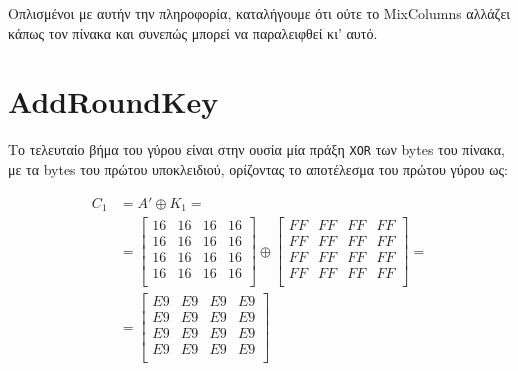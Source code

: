 \documentclass{article}
\begin{document}
Οπλισμένοι με αυτήν την πληροφορία, καταλήγουμε ότι ούτε το MixColumns αλλάζει κάπως τον πίνακα και συνεπώς μπορεί να παραλειφθεί κι' αυτό.

\section*{AddRoundKey}

Το τελευταίο βήμα του γύρου είναι στην ουσία μία πράξη \texttt{XOR} των bytes του πίνακα, με τα bytes του πρώτου υποκλειδιού, ορίζοντας το αποτέλεσμα του πρώτου γύρου ως:

\begin{align*}
C_1 &= A' \oplus K_1 = \\
    &=
    \begin{bmatrix}
    16 & 16 & 16 & 16 \\
    16 & 16 & 16 & 16 \\
    16 & 16 & 16 & 16 \\
    16 & 16 & 16 & 16 \\
    \end{bmatrix} \oplus
    \begin{bmatrix}
    FF & FF & FF & FF \\
    FF & FF & FF & FF \\
    FF & FF & FF & FF \\
    FF & FF & FF & FF \\
    \end{bmatrix} = \\
    &=
    \begin {bmatrix}
    E9 & E9 & E9 & E9 \\
    E9 & E9 & E9 & E9 \\
    E9 & E9 & E9 & E9 \\
    E9 & E9 & E9 & E9 \\
    \end {bmatrix}
\end{align*}
\end{document}
